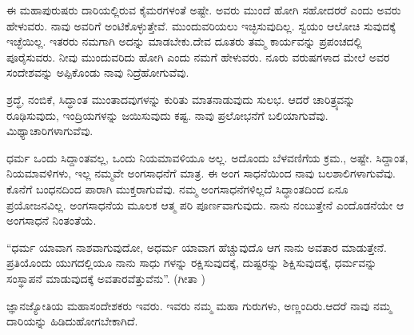 ಈ ಮಹಾಪುರುಷರು ದಾರಿಯಲ್ಲಿರುವ ಕೈಮರಗಳಂತೆ ಅಷ್ಟೇ. ಅವರು ಮುಂದೆ ಹೋಗಿ ಸಹೋದರರೆ ಎಂದು ಅವರು ಹೇಳುವರು. ನಾವು ಅವರಿಗೆ ಅಂಟಿಕೊಳ್ಳುತ್ತೇವೆ. ಮುಂದುವರಿಯಲು ಇಚ್ಛಿಸುವುದಿಲ್ಲ. ಸ್ವಯಂ ಆಲೋಚಿ ಸುವುದಕ್ಕೆ ಇಚ್ಛೆಯಿಲ್ಲ. ಇತರರು ನಮಗಾಗಿ ಅದನ್ನು ಮಾಡಬೇಕು.ದೇವ ದೂತರು ತಮ್ಮ ಕಾರ್ಯವನ್ನು ಪ್ರಪಂಚದಲ್ಲಿ ಪೂರೈಸುವರು. ನೀವು ಮುಂದುವರಿದು ಹೋಗಿ ಎಂದು ನಮಗೆ ಹೇಳುವರು. ನೂರು ವರುಷಗಳಾದ ಮೇಲೆ ಅವರ ಸಂದೇಶವನ್ನು ಅಪ್ಪಿಕೊಂಡು ನಾವು ನಿದ್ರೆಹೋಗುವೆವು.

ಶ್ರದ್ಧೆ, ನಂಬಿಕೆ, ಸಿದ್ಧಾಂತ ಮುಂತಾದವುಗಳನ್ನು ಕುರಿತು ಮಾತನಾಡುವುದು ಸುಲಭ. ಆದರೆ ಚಾರಿತ್ರ್ಯವನ್ನು ರೂಢಿಸುವುದು, ಇಂದ್ರಿಯಗಳನ್ನು ಜಯಿಸುವುದು ಕಷ್ಟ. ನಾವು ಪ್ರಲೋಭನೆಗೆ ಬಲಿಯಾಗುವೆವು. ಮಿಥ್ಯಾಚಾರಿಗಳಾಗುವೆವು.

ಧರ್ಮ ಒಂದು ಸಿದ್ದಾಂತವಲ್ಲ, ಒಂದು ನಿಯಮಾವಳಿಯೂ ಅಲ್ಲ. ಅದೊಂದು ಬೆಳವಣಿಗೆಯ ಕ್ರಮ., ಅಷ್ಟೇ. ಸಿದ್ದಾಂತ, ನಿಯಮಾವಳಿಗಳು, ಇಲ್ಲ ನಮ್ಮವೇ ಅಂಗಸಾಧನೆಗೆ ಮಾತ್ರ. ಈ ಅಂಗ ಸಾಧನೆಯಿಂದ ನಾವು ಬಲಶಾಲಿಗಳಾಗುವೆವು. ಕೊನೆಗೆ ಬಂಧನದಿಂದ ಪಾರಾಗಿ ಮುಕ್ತರಾಗುವೆವು. ನಮ್ಮ ಅಂಗಸಾಧನೆಗಳಿಲ್ಲದೆ ಸಿದ್ಧಾಂತದಿಂದ ಏನೂ ಪ್ರಯೋಜನವಿಲ್ಲ. ಅಂಗಸಾಧನೆಯ ಮೂಲಕ ಆತ್ಮ ಪರಿ ಪೂರ್ಣವಾಗುವುದು. ನಾನು ನಂಬುತ್ತೇನೆ ಎಂದೊಡನೆಯೇ ಆ ಅಂಗಸಾಧನೆ ನಿಂತಂತೆಯೆ.

“ಧರ್ಮ ಯಾವಾಗ ನಾಶವಾಗುವುದೋ, ಅಧರ್ಮ ಯಾವಾಗ ಹೆಚ್ಚುವುದೊ ಆಗ ನಾನು ಅವತಾರ ಮಾಡುತ್ತೇನೆ. ಪ್ರತಿಯೊಂದು ಯುಗದಲ್ಲಿಯೂ ನಾನು ಸಾಧು ಗಳನ್ನು ರಕ್ಷಿಸುವುದಕ್ಕೆ, ದುಷ್ಟರನ್ನು ಶಿಕ್ಷಿಸುವುದಕ್ಕೆ, ಧರ್ಮವನ್ನು ಸಂಸ್ಥಾಪನೆ ಮಾಡುವುದಕ್ಕೆ ಅವತಾರವೆತ್ತುವೆನು”. (ಗೀತಾ )

ಜ್ಞಾನಜ್ಯೋತಿಯ ಮಹಾಸಂದೇಶಕರು ಇವರು. ಇವರು ನಮ್ಮ ಮಹಾ ಗುರುಗಳು, ಅಣ್ಣಂದಿರು.ಆದರೆ ನಾವು ನಮ್ಮ ದಾರಿಯನ್ನು ಹಿಡಿದುಹೋಗಬೇಕಾಗಿದೆ.

